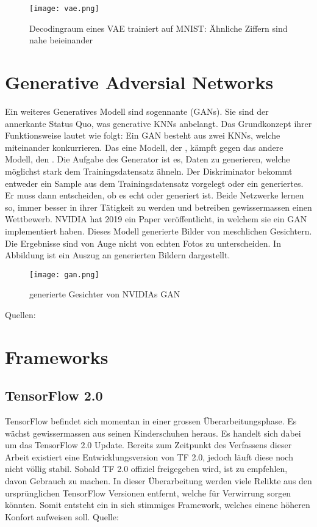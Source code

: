 \begin{figure}[h!]
  \centering
  \texttt{[image: vae.png]}
  \caption{Decodingraum eines VAE trainiert auf MNIST: Ähnliche Ziffern sind
    nahe beieinander \cite{res:vae}}
  \label{fig:vae}
\end{figure}

\cite{wiki:autoencoder}

\section*{Generative Adversial Networks}
Ein weiteres Generatives Modell sind sogennante  (GANs). Sie sind der annerkante Status Quo, was generative KNNs
anbelangt.
\para{}
Das Grundkonzept ihrer Funktionsweise lautet wie folgt: Ein GAN besteht aus zwei
KNNs, welche miteinander konkurrieren. Das eine Modell, der
, kämpft gegen das andere Modell, den .
Die Aufgabe des Generator ist es, Daten zu generieren, welche möglichst stark
dem Trainingsdatensatz ähneln. Der Diskriminator bekommt entweder
ein Sample aus dem Trainingsdatensatz vorgelegt oder ein generiertes.
Er muss dann entscheiden, ob es echt oder generiert ist. Beide Netzwerke lernen so,
immer besser in ihrer Tätigkeit zu werden und betreiben gewissermassen einen Wettbewerb.
\para{}
NVIDIA hat 2019 ein Paper veröffentlicht, in welchem sie ein GAN implementiert
haben. Dieses Modell generierte Bilder von meschlichen Gesichtern. Die
Ergebnisse sind von Auge nicht von echten Fotos zu unterscheiden.
In Abbildung  ist ein Auszug an generierten Bildern dargestellt.

\begin{figure}[h!]
  \centering
  \texttt{[image: gan.png]}
  \caption{generierte Gesichter von NVIDIAs GAN \cite{paper:gan}}
  \label{fig:nvidia_gan}
\end{figure}
\para{}
Quellen: \cite{paper:gan}

\section*{Frameworks}
\subsection*{TensorFlow 2.0}
TensorFlow befindet sich momentan in einer grossen Überarbeitungsphase. Es
wächst gewissermassen aus seinen Kinderschuhen heraus. Es handelt sich dabei um das
TensorFlow 2.0 Update. Bereits zum Zeitpunkt des Verfassens dieser Arbeit
existiert eine Entwicklungsversion von TF 2.0, jedoch läuft diese noch nicht
völlig stabil. Sobald TF 2.0 offiziel freigegeben wird, ist zu empfehlen,
davon Gebrauch zu machen. In dieser Überarbeitung werden viele Relikte aus den
ursprünglichen TensorFlow Versionen entfernt, welche für Verwirrung sorgen
könnten. Somit entsteht ein in sich stimmiges Framework, welches einene höheren
Konfort aufweisen soll.
\para{}
Quelle: \cite{net:tf_2.0}


